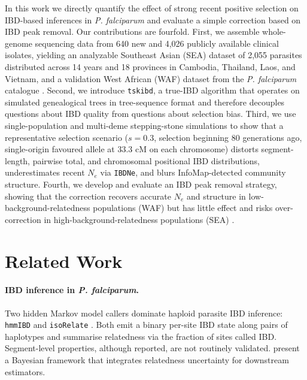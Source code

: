 \documentclass[11pt]{article}
\begin{document}
In this work we directly quantify the effect of strong recent positive selection on IBD-based inferences in \textit{P. falciparum} and evaluate a simple correction based on IBD peak removal. Our contributions are fourfold. First, we assemble whole-genome sequencing data from 640 new and 4,026 publicly available clinical isolates, yielding an analyzable Southeast Asian (SEA) dataset of 2,055 parasites distributed across 14 years and 18 provinces in Cambodia, Thailand, Laos, and Vietnam, and a validation West African (WAF) dataset from the \textit{P. falciparum} catalogue \citep{malariagen2021pf6,manske2012analysis}. Second, we introduce \texttt{tskibd}, a true-IBD algorithm that operates on simulated genealogical trees in tree-sequence format \citep{kelleher2018efficient,haller2019treeseq,baumdicker2022msprime} and therefore decouples questions about IBD quality from questions about selection bias. Third, we use single-population and multi-deme stepping-stone simulations \citep{haller2019slim,kelleher2016msprime} to show that a representative selection scenario ($s = 0.3$, selection beginning $80$ generations ago, single-origin favoured allele at $33.3$ cM on each chromosome) distorts segment-length, pairwise total, and chromosomal positional IBD distributions, underestimates recent $N_e$ via \texttt{IBDNe}, and blurs InfoMap-detected community structure. Fourth, we develop and evaluate an IBD peak removal strategy, showing that the correction recovers accurate $N_e$ and structure in low-background-relatedness populations (WAF) but has little effect and risks over-correction in high-background-relatedness populations (SEA) \citep{daniels2015modeling,verity2020diversity}.

\section{Related Work}

\paragraph{IBD inference in \textit{P. falciparum}.} Two hidden Markov model callers dominate haploid parasite IBD inference: \texttt{hmmIBD} \citep{schaffner2018hmmibd} and \texttt{isoRelate} \citep{henden2018isorelate}. Both emit a binary per-site IBD state along pairs of haplotypes and summarise relatedness via the fraction of sites called IBD. Segment-level properties, although reported, are not routinely validated. \citet{taylor2019ibd} present a Bayesian framework that integrates relatedness uncertainty for downstream estimators.
\end{document}
